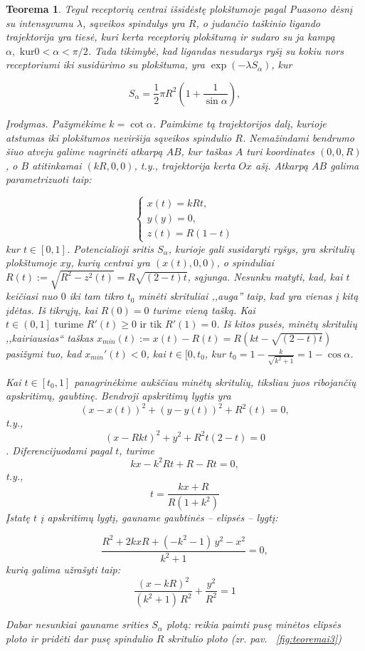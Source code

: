 \documentclass[10pt]{article}
\newtheorem{thm}{Teorema}
\begin{document}
\begin{thm}\label{thm:3}
Tegul receptorių centrai išsidėstę plokštumoje  pagal Puasono dėsnį su intensyvumu $\lambda$,  sąveikos spindulys yra $R$, o judančio taškinio ligando trajektorija yra  tiesė, kuri kerta receptorių plokštumą ir sudaro su ja kampą $\alpha, \mbox{  kur} 0 < \alpha < \pi/2 $. Tada  tikimybė, kad ligandas nesudarys ryšį su kokiu nors receptoriumi  iki susidūrimo su plokštuma, yra $ \exp( -\lambda S_{\alpha}) $, kur 

\[
S_{\alpha} = \frac{1}{2} \pi R^2 \left(1 + \frac{1}{\sin \alpha } \right),
\]

Įrodymas. Pažymėkime $ k = \cot \alpha $. Paimkime tą trajektorijos dalį, kurioje atstumas iki plokštumos neviršija sąveikos spindulio  $ R $. Nemažindami bendrumo šiuo atveju galime nagrinėti atkarpą $ AB $, kur taškas $ A $ turi koordinates $ (0,0,R) $, o $ B $ atitinkamai  $ (kR,0,0) $, t.y., trajektorija kerta $ Ox $ ašį. Atkarpą  $ AB $ galima parametrizuoti taip:

\[
\begin{cases}
x(t) = kRt, \\
y(y) = 0, \\
z(t) = R(1-t)
\end{cases}
\]
kur $ t \in [0,1] $. Potencialioji sritis $ S_{\alpha} $, kurioje gali susidaryti ryšys, yra skritulių plokštumoje $ xy $, kurių centrai yra $ (x(t),0,0)$, o spinduliai $ R(t):=\sqrt{R^2-z^2(t)}=R\sqrt{(2-t)t} $, sąjunga.
Nesunku matyti, kad, kai $ t $ keičiasi nuo $ 0 $ iki tam tikro $ t_0 $ minėti skrituliai ,,auga'' taip, kad yra vienas į kitą įdėtas. 
Iš tikrųjų, kai $ R(0)=0 $  turime vieną tašką. Kai $ t \in \left( 0,1 \right] \mbox{ turime } R'(t) \geq 0 \mbox{ ir tik } R'(1)=0 $. Iš kitos pusės, minėtų skritulių ,,kairiausias`` taškas $ x_{min}(t) := x(t) - R(t) = R(kt-\sqrt{(2-t)t}) $ pasižymi tuo, kad $ x_{min}'(t) < 0 $, kai $ t \in [0, t_{0} $, kur 
$ t_{0} = 1 - \frac{k}{\sqrt{k^2+1}} = 1 - \cos \alpha  $.

Kai $ t \in [t_{0}, 1] $ panagrinėkime aukščiau minėtų skritulių, tiksliau juos ribojančių apskritimų, gaubtinę. Bendroji apskritimų lygtis yra
$$ (x-x(t))^2 + (y-y(t))^2 + R^2(t) = 0, $$ 
t.y.,
$$ (x-Rkt)^2 + y^2 + R^2t(2-t) = 0 $$. 
Diferencijuodami pagal $ t $, turime 
$$ kx-k^2Rt+R-Rt = 0,  $$
t.y.,
$$
	t=\frac{kx+R}{R(1+k^2)}
$$
Įstatę $ t $ į apskritimų lygtį, gauname  gaubtinės -- elipsės -- lygtį:

\[\frac{{R}^{2}+2kxR+\left( -{k}^{2}-1\right) \,{y}^{2}-{x}^{2}}{{k}^{2}+1}=0, \]
kurią galima užrašyti taip:
\[\frac{{\left( x-kR\right) }^{2}}{\left( {k}^{2}+1\right) \,{R}^{2}}+\frac{{y}^{2}}{{R}^{2}}=1\]


Dabar nesunkiai gauname srities $ S_{\alpha} $ plotą: reikia paimti pusę minėtos elipsės ploto ir pridėti dar  pusę spindulio $ R $ skritulio ploto (zr. pav. ~\ref{fig:teoremai3}) 

\end{thm}
\end{document}
